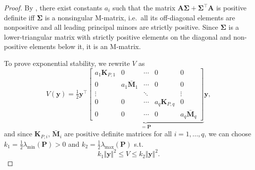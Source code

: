 \documentclass[../main.tex]{subfiles}
\begin{document}
\begin{proof}
    By \cite[Lemma 9.7]{Khalil}, there exist constants $a_i$ such that the matrix $\bm{A} \bm{\Sigma} + \bm{\Sigma}^\top \bm{A}$ is positive definite iff $\bm{\Sigma}$ is a nonsingular M-matrix, i.e.~all its off-diagonal elements are nonpositive and all leading principal minors are strictly positive. Since $\bm{\Sigma}$ is a lower-triangular matrix with strictly positive elements on the diagonal and non-positive elements below it, it is an M-matrix.



    To prove exponential stability, we rewrite $V$ as
    \begin{equation}
        V(\bm{y}) = \tfrac{1}{2} \bm{y}^\top \underbrace{\left[ \begin{smallmatrix}
        a_1 \bm{K}_{P,1} & 0 & \cdots & 0 & 0 \\
        0 & a_1 \bar{\bm{M}}_1 & \cdots & 0 & 0 \\
        \vdots & & \ddots & & \vdots \\
        0 & 0 & \cdots & a_q \bm{K}_{P,q} & 0\\
        0 & 0 & \cdots & 0 & a_q \bar{\bm{M}}_q
        \end{smallmatrix} \right]}_{=\bm{P}} \bm{y} ,
    \end{equation}
    and since $\bm{K}_{P,i}$, $\bar{\bm{M}}_i$ are positive definite matrices for all $i=1,\ldots,q$, we can choose $k_1 = \frac{1}{2} \lambda_{\min}(\bm{P}) > 0$ and $k_2 = \frac{1}{2} \lambda_{\max}(\bm{P})$ s.t.
    \begin{equation}\label{eq:comp:Vbounds}
        k_1 \Vert \bm{y} \Vert^2 \leq V \leq k_2 \Vert \bm{y} \Vert^2 .
    \end{equation}


\end{proof}
\end{document}
